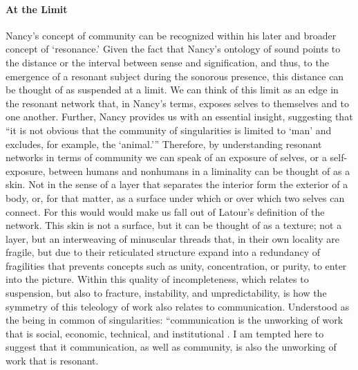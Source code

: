 

\paragraph{At the Limit}
Nancy's concept of community can be recognized within his later and broader concept of `resonance.' Given the fact that Nancy's ontology of sound points to the distance or the interval between sense and signification, and thus, to the emergence of a resonant subject during the sonorous presence, this distance can be thought of as suspended at a limit. We can think of this limit as an edge in the resonant network that, in Nancy's terms, exposes selves to themselves and to one another. Further, Nancy provides us with an essential insight, suggesting that ``it is not obvious that the community of singularities is limited to `man' and excludes, for example, the `animal.''' \parencite[28]{Nan91:The} Therefore, by understanding resonant networks in terms of community we can speak of an exposure of selves, or a self-exposure, between humans and nonhumans in a liminality can be thought of as a skin. Not in the sense of a layer that separates the interior form the exterior of a body, or, for that matter, as a surface under which or over which two selves can connect. For this would would make us fall out of Latour's definition of the network. This skin is not a surface, but it can be thought of as a texture; not a layer, but an interweaving of minuscular threads that, in their own locality are fragile, but due to their reticulated structure expand into a redundancy of fragilities that prevents concepts such as unity, concentration, or purity, to enter into the picture. Within this quality of incompleteness, which relates to suspension, but also to fracture, instability, and unpredictability, is how the symmetry of this teleology of work also relates to communication. Understood as the being in common of singularities: ``communication is the unworking of work that is social, economic, technical, and institutional \parencite[31]{Nan91:The}. I am tempted here to suggest that it communication, as well as community, is also the unworking of work that is resonant.




